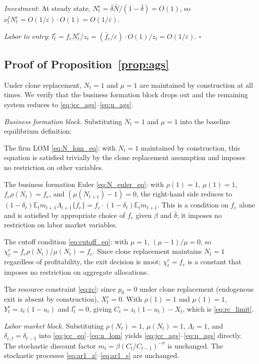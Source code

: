 \documentclass[authoryear, review, 12pt]{elsarticle}
\begin{document}
\emph{Investment}: At steady state, 
$N_t^e=\bar{\delta}\bar{N}/(1-\bar{\delta})=O(1)$, 
so $\nu_t^f N_t^e = O(1/\varepsilon)\cdot O(1) 
= O(1/\varepsilon)$.

\emph{Labor to entry}: $l_t^e=f_eN_t^e/z_t = 
(\bar{f}_e/\varepsilon)\cdot O(1)/z_t = 
O(1/\varepsilon)$. $\square$

\subsection*{Proof of Proposition~\ref{prop:ags}}

Under clone replacement, $N_t=1$ and $\mu=1$ are 
maintained by construction at all times. We verify 
that the business formation block drops out and 
the remaining system reduces to 
\eqref{eq:jcc_ags}--\eqref{eq:u_ags}.

\emph{Business formation block.} Substituting 
$N_t=1$ and $\mu=1$ into the baseline equilibrium 
definition:

The firm LOM \eqref{eq:N_lom_eq}: with $N_t=1$ 
maintained by construction, this equation is 
satisfied trivially by the clone replacement 
assumption and imposes no restriction on other 
variables.

The business formation Euler \eqref{eq:N_euler_eq}: 
with $\rho(1)=1$, $\mu(1)=1$, $f_e\rho(N_t)=f_e$, 
and $(\mu(N_{t+1})-1)=0$, the right-hand side 
reduces to $(1-\delta_t)\mathbb{E}_t m_{t+1}\Lambda_{t+1}
\{f_e\}=f_e\cdot(1-\delta_t)\mathbb{E}_t m_{t+1}$. 
This is a condition on $f_e$ alone and is satisfied 
by appropriate choice of $f_e$ given $\beta$ and 
$\bar{\delta}$; it imposes no restriction on labor 
market variables.

The cutoff condition \eqref{eq:cutoff_eq}: with 
$\mu=1$, $(\mu-1)/\mu=0$, so 
$\chi_t^c = f_e\rho(N_t)/\mu(N_t) = f_e$. Since 
clone replacement maintains $N_t=1$ regardless of 
profitability, the exit decision is moot; 
$\chi_t^c=f_e$ is a constant that imposes no 
restriction on aggregate allocations.

The resource constraint \eqref{eq:rc}: since 
$p_0=0$ under clone replacement (endogenous exit 
is absent by construction), $X_t^c=0$. With 
$\rho(1)=1$ and $\mu(1)=1$, $Y_t^c=z_t(1-u_t)$ 
and $l_t^e=0$, giving $C_t=z_t(1-u_t)-X_t$, 
which is \eqref{eq:rc_limit}.

\emph{Labor market block.} Substituting $\rho(N_t)=1$, 
$\mu(N_t)=1$, $\Lambda_t=1$, and 
$\delta_{e,t}=\delta_{t-1}$ into 
\eqref{eq:jcc_eq}--\eqref{eq:u_lom} yields 
\eqref{eq:jcc_ags}--\eqref{eq:u_ags} directly. 
The stochastic discount factor 
$m_t=\beta(C_t/C_{t-1})^{-\sigma}$ is unchanged. 
The stochastic processes \eqref{eq:ar1_z}--\eqref{eq:ar1_s} 
are unchanged.
\end{document}
